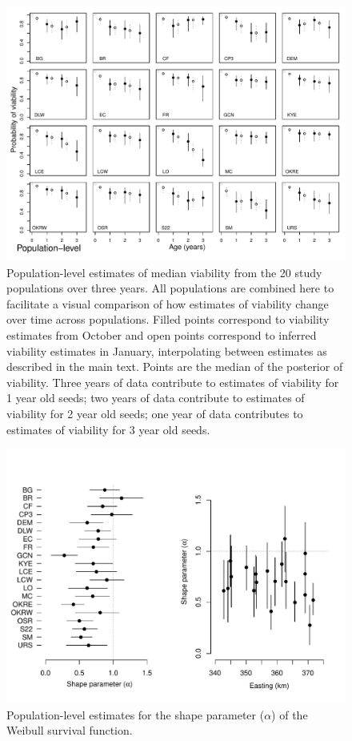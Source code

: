 \documentclass[12pt, oneside]{article}   	%
\begin{document}
 \begin{figure}[!h]
   \centering
       \includegraphics[page=2,width=1\textwidth]{../../figures/viability-estimates-population.pdf}  
    \caption{ Population-level estimates of median viability from the 20 study populations over three years. All populations are combined here to facilitate a visual comparison of how estimates of viability change over time across populations. Filled points correspond to viability estimates from October and open points correspond to inferred viability estimates in January, interpolating between estimates as described in the main text. Points are the median of the posterior of viability. Three years of data contribute to estimates of viability for 1 year old seeds; two years of data contribute to estimates of viability for 2 year old seeds; one year of data contributes to estimates of viability for 3 year old seeds.  }
 \label{fig:viability-estimates-population}
\end{figure}

 \begin{figure}[!h]
   \centering
       \includegraphics[page=1,width=1\textwidth]{../../figures/survival-function-parms-population.pdf}  
    \caption{ Population-level estimates for the shape parameter ($\alpha$) of the Weibull survival function. }
 \label{fig:viability-estimates-population}
\end{figure}
\end{document}
